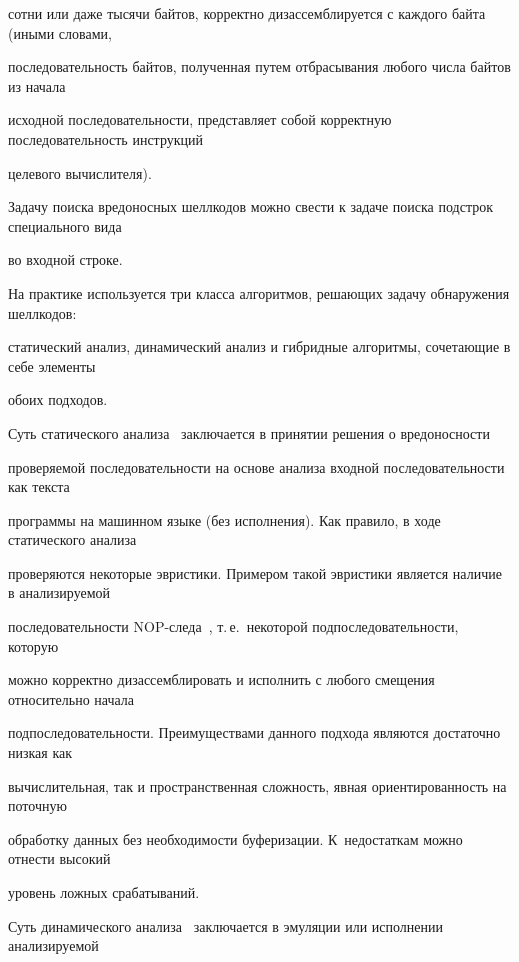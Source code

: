 сотни или даже тысячи байтов, корректно дизассемблируется с каждого байта (иными словами, 


последовательность байтов, полученная путем отбрасывания любого числа байтов из начала 


исходной последовательности, представляет собой корректную последовательность инструкций 


целевого вычислителя).





Задачу поиска вредоносных шеллкодов можно свести к задаче поиска подстрок специального вида 


во входной строке.





На практике используется три класса алгоритмов, решающих задачу обнаружения шеллкодов: 


статический анализ, динамический анализ и гибридные алгоритмы, сочетающие в себе элементы 


обоих подходов. 





Суть статического анализа~\cite{1-bez, 6-bez} заключается в принятии решения о вредоносности 


проверяемой последовательности на основе анализа входной последовательности как текста 


программы на машинном языке (без исполнения). Как правило, в ходе статического анализа 


проверяются некоторые эвристики. Примером такой эвристики является наличие в анализируемой 


последовательности NOP-сле\-да~\cite{6-bez}, т.\,е.\ некоторой подпоследовательности, которую 


можно корректно дизассемблировать и исполнить с любого смещения относительно начала 


подпоследовательности. Преимуществами данного подхода являются достаточно низкая как 


вычислительная, так и пространственная сложность, явная ориентированность на поточную 


обработку данных без необходимости буферизации. К~недостаткам можно отнести высокий 


уровень ложных срабатываний.





Суть динамического анализа~\cite{7-bez} заключается в эмуляции или исполнении анализируемой 


